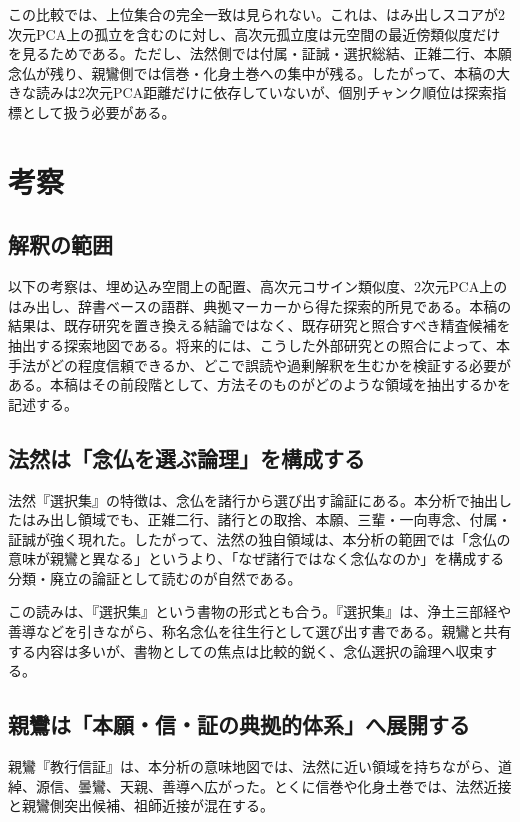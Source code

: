 \documentclass[uplatex,dvipdfmx,11pt,a4paper]{jsarticle}
\begin{document}
この比較では、上位集合の完全一致は見られない。これは、はみ出しスコアが2次元PCA上の孤立を含むのに対し、高次元孤立度は元空間の最近傍類似度だけを見るためである。ただし、法然側では付属・証誠・選択総結、正雑二行、本願念仏が残り、親鸞側では信巻・化身土巻への集中が残る。したがって、本稿の大きな読みは2次元PCA距離だけに依存していないが、個別チャンク順位は探索指標として扱う必要がある。

\section{考察}

\subsection{解釈の範囲}

以下の考察は、埋め込み空間上の配置、高次元コサイン類似度、2次元PCA上のはみ出し、辞書ベースの語群、典拠マーカーから得た探索的所見である。本稿の結果は、既存研究を置き換える結論ではなく、既存研究と照合すべき精査候補を抽出する探索地図である。将来的には、こうした外部研究との照合によって、本手法がどの程度信頼できるか、どこで誤読や過剰解釈を生むかを検証する必要がある。本稿はその前段階として、方法そのものがどのような領域を抽出するかを記述する。

\subsection{法然は「念仏を選ぶ論理」を構成する}

法然『選択集』の特徴は、念仏を諸行から選び出す論証にある。本分析で抽出したはみ出し領域でも、正雑二行、諸行との取捨、本願、三輩・一向専念、付属・証誠が強く現れた。したがって、法然の独自領域は、本分析の範囲では「念仏の意味が親鸞と異なる」というより、「なぜ諸行ではなく念仏なのか」を構成する分類・廃立の論証として読むのが自然である。

この読みは、『選択集』という書物の形式とも合う。『選択集』は、浄土三部経や善導などを引きながら、称名念仏を往生行として選び出す書である。親鸞と共有する内容は多いが、書物としての焦点は比較的鋭く、念仏選択の論理へ収束する。

\subsection{親鸞は「本願・信・証の典拠的体系」へ展開する}

親鸞『教行信証』は、本分析の意味地図では、法然に近い領域を持ちながら、道綽、源信、曇鸞、天親、善導へ広がった。とくに信巻や化身土巻では、法然近接と親鸞側突出候補、祖師近接が混在する。
\end{document}
